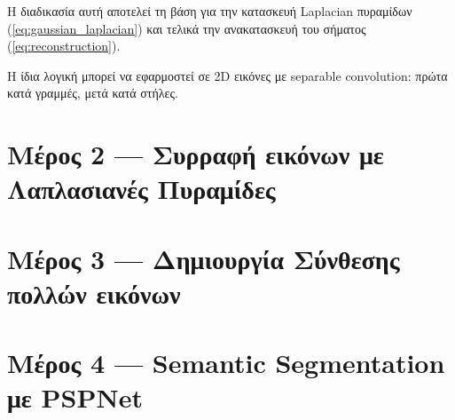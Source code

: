 \documentclass[12pt]{article}
\begin{document}
Η διαδικασία αυτή αποτελεί τη βάση για την κατασκευή Laplacian πυραμίδων (\eqref{eq:gaussian_laplacian}) και τελικά την ανακατασκευή του σήματος (\eqref{eq:reconstruction}).  

Η ίδια λογική μπορεί να εφαρμοστεί σε 2D εικόνες με separable convolution: πρώτα κατά γραμμές, μετά κατά στήλες.



\section{Μέρος 2 — Συρραφή εικόνων με Λαπλασιανές Πυραμίδες}



\section{Μέρος 3 — Δημιουργία Σύνθεσης πολλών εικόνων}


\section{Μέρος 4 — Semantic Segmentation με PSPNet}
\end{document}
